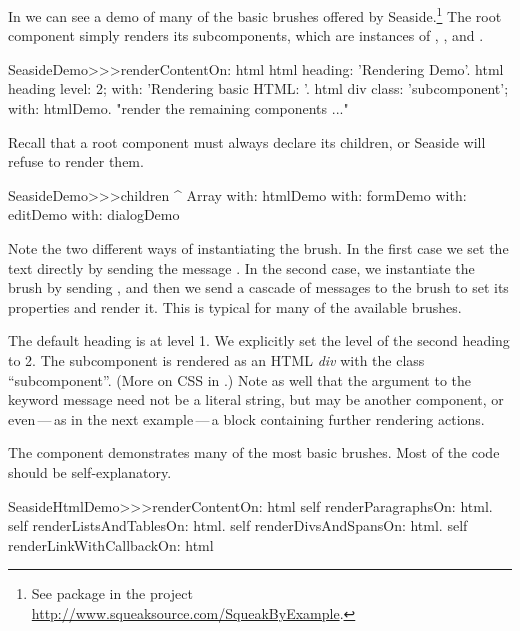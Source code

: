 \documentclass[a4paper,10pt,twoside]{book}
\begin{document}
In  we can see a demo of many of the basic brushes offered by Seaside.\footnote{See package  in the project \url{http://www.squeaksource.com/SqueakByExample}.}
The root component  simply renders its subcomponents, which are instances of , ,  and .

\begin{code}{}
SeasideDemo>>>renderContentOn: html
	html heading: 'Rendering Demo'.
	html heading
		level: 2;
		with: 'Rendering basic HTML: '.
	html div
		class: 'subcomponent';
		with: htmlDemo.
	"render the remaining components ..."
\end{code}

Recall that a root component must always declare its children, or Seaside will refuse to render them.
\begin{code}{}
SeasideDemo>>>children
	^ Array with: htmlDemo with: formDemo with: editDemo with: dialogDemo
\end{code}

Note the two different ways of instantiating the  brush.
In the first case we set the text directly by sending the message .
In the second case, we instantiate the brush by sending , and then we send a cascade of messages to the brush to set its properties and render it.
This is typical for many of the available brushes.


The default heading is at level 1.
We explicitly set the level of the second heading to 2.
The subcomponent is rendered as an HTML \emph{div} with the  class ``subcomponent''.
(More on CSS in .)
Note as well that the argument to the  keyword message need not be a literal string, but may be another component, or even\,---\,as in the next example\,---\,a block containing further rendering actions.

The  component demonstrates many of the most basic brushes.
Most of the code should be self-explanatory.

\begin{code}{}
SeasideHtmlDemo>>>renderContentOn: html 
	self renderParagraphsOn: html.
	self renderListsAndTablesOn: html.
	self renderDivsAndSpansOn: html.
	self renderLinkWithCallbackOn: html
\end{code}
\end{document}
